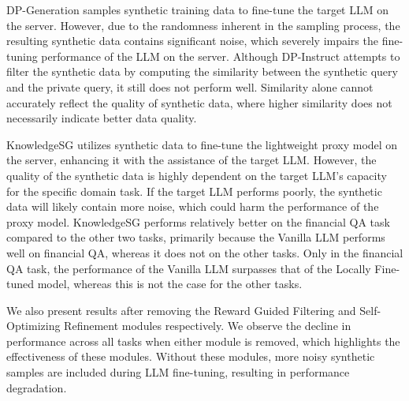 DP-Generation samples synthetic training data to fine-tune the target LLM on the server.  
However, due to the randomness inherent in the sampling process, the resulting synthetic data contains significant noise, which severely impairs the fine-tuning performance of the LLM on the server.
Although DP-Instruct attempts to filter the synthetic data by computing the similarity between the synthetic query and the private query, it still does not perform well. 
Similarity alone cannot accurately reflect the quality of synthetic data, where higher similarity does not necessarily indicate better data quality.

KnowledgeSG utilizes synthetic data to fine-tune the lightweight proxy model on the server, enhancing it with the assistance of the target LLM. 
However, the quality of the synthetic data is highly dependent on the target LLM’s capacity for the specific domain task. 
If the target LLM performs poorly, the synthetic data will likely contain more noise, which could harm the performance of the proxy model. 
KnowledgeSG performs relatively better on the financial QA task compared to the other two tasks, primarily because the Vanilla LLM performs well on financial QA, whereas it does not on the other tasks. 
Only in the financial QA task, the performance of the Vanilla LLM surpasses that of the Locally Fine-tuned model, whereas this is not the case for the other tasks.

We also present results after removing the Reward Guided Filtering and Self-Optimizing Refinement modules respectively. 
We observe the decline in performance across all tasks when either module is removed, which highlights the effectiveness of these modules. 
Without these modules, more noisy synthetic samples are included during LLM fine-tuning, resulting in performance degradation. 





